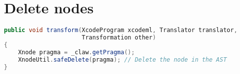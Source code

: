 \section{Delete nodes}
\begin{lstlisting}[label=lst:delete_node, language=Java, caption=XcodeML/F delete node example]
public void transform(XcodeProgram xcodeml, Translator translator,
                      Transformation other)
{
    Xnode pragma = _claw.getPragma();
    XnodeUtil.safeDelete(pragma); // Delete the node in the AST
}
\end{lstlisting}

